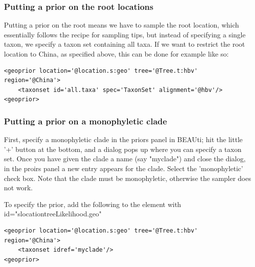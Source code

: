\documentclass{article}
\begin{document}
\subsubsection*{Putting a prior on the root locations}

Putting a prior on the root means we have to sample the root location, which essentially follows the recipe for sampling tips, but instead of specifying a single taxon, we specify a taxon set containing all taxa. If we want to restrict the root location to China, as specified above, this can be done for example like so:

\begin{verbatim}
<geoprior location='@location.s:geo' tree='@Tree.t:hbv' region='@China'>
	<taxonset id='all.taxa' spec='TaxonSet' alignment='@hbv'/>
<geoprior>
\end{verbatim}


\subsubsection*{Putting a prior on a monophyletic clade}

First, specify a monophyletic clade in the priors panel in BEAUti; hit the little '+' button at the bottom, and a dialog pops up where you can specify a taxon set. Once you have given the clade a name (say "myclade") and close the dialog, in the proirs panel a new entry appears for the clade. Select the 'monophyletic' check box. Note that the clade must be monophyletic, otherwise the sampler does not work.

To specify the prior, add the following to the element with id="slocationtreeLikelihood.geo"

\begin{verbatim}
<geoprior location='@location.s:geo' tree='@Tree.t:hbv' region='@China'>
	<taxonset idref='myclade'/>
<geoprior>
\end{verbatim}







\end{document}
